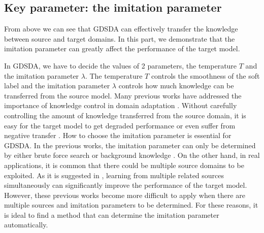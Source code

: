 \subsection{Key parameter: the imitation parameter}\label{sec:key}
From above we can see that GDSDA can effectively transfer the knowledge between source and target domains. In this part, we demonstrate that the imitation parameter can greatly affect the performance of the target model.

In GDSDA, we have to decide the values of 2 parameters, the temperature $T$ and the imitation parameter $\lambda$. The temperature $T$ controls the smoothness of the soft label and the imitation parameter $\lambda$ controls how much knowledge can be transferred from the source model. Many previous works have addressed the importance of knowledge control in domain adaptation \cite{duan2012learning,duan2012visual}. Without carefully controlling the amount of knowledge transferred from the source domain, it is easy for the target model to get degraded performance or even suffer from negative transfer \cite{pan2010survey}.
How to choose the imitation parameter is essential for GDSDA. In the previous works, the imitation parameter can only be determined by either brute force search \cite{lopez2015unifying} or background knowledge \cite{Tzeng_2015_ICCV}. On the other hand, in real applications, it is common that there could be multiple source domains to be exploited. As it is suggested in \cite{tommasi2014learning}, learning from multiple related sources simultaneously can significantly improve the performance of the target model. However, these previous works become more difficult to apply when there are multiple sources and imitation parameters to be determined.
For these reasons, it is ideal to find a method that can determine the imitation parameter automatically.



